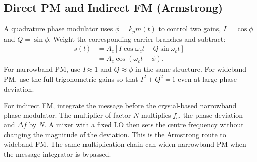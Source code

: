 \documentclass[12pt,a4paper]{article}
\begin{document}
\subsection{Direct PM and Indirect FM (Armstrong)}
A quadrature phase modulator uses $\phi=k_pm(t)$ to control two gains, $I=\cos\phi$ and $Q=\sin\phi$. Weight the corresponding carrier branches and subtract:
\[
\begin{aligned}
 s(t)&=A_c[I\cos\omega_ct-Q\sin\omega_ct]\\
     &=A_c\cos(\omega_ct+\phi).
\end{aligned}
\]
For narrowband PM, use $I\approx1$ and $Q\approx\phi$ in the same structure. For wideband PM, use the full trigonometric gains so that $I^2+Q^2=1$ even at large phase deviation.

For indirect FM, integrate the message before the crystal-based narrowband phase modulator. The multiplier of factor $N$ multiplies $f_c$, the phase deviation and $\Delta f$ by $N$. A mixer with a fixed LO then sets the centre frequency without changing the magnitude of the deviation. This is the Armstrong route to wideband FM. The same multiplication chain can widen narrowband PM when the message integrator is bypassed.

\begin{tcolorbox}[tikzbox, unbreakable, title={Direct FM, Quadrature PM and Armstrong FM}]
\centering
{}\par
\end{tcolorbox}
\end{document}

